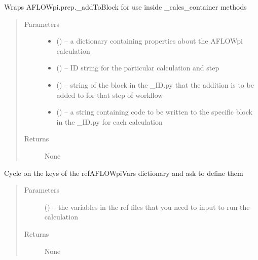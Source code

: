 \documentclass[letterpaper,10pt,english]{sphinxmanual}
\begin{document}
\begin{fulllineitems}
\label{\detokenize{prep:prep.addToBlockWrapper}}
Wraps AFLOWpi.prep.\_addToBlock for use inside \_calcs\_container methods
\begin{quote}\begin{description}
\item[{Parameters}] \leavevmode\begin{itemize}
\item {} 
 () -- a dictionary containing properties about the AFLOWpi calculation

\item {} 
 () -- ID string for the particular calculation and step

\item {} 
 () -- string of the block in the \_ID.py that the addition is to be added to
for that step of workflow

\item {} 
 () -- a string containing code to be written to the specific block
in the \_ID.py for each calculation

\end{itemize}

\item[{Returns}] \leavevmode
None

\end{description}\end{quote}

\end{fulllineitems}


\begin{fulllineitems}
\label{\detokenize{prep:prep.askAFLOWpiVars}}
Cycle on the keys of the refAFLOWpiVars dictionary and ask to define them
\begin{quote}\begin{description}
\item[{Parameters}] \leavevmode
{} () -- the variables in the ref files that you need to input to run the calculation

\item[{Returns}] \leavevmode
None

\end{description}\end{quote}

\end{fulllineitems}
\end{document}
